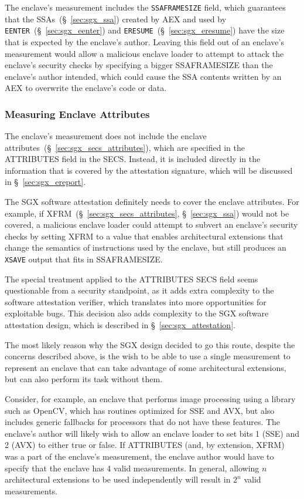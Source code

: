 The enclave's measurement includes the \texttt{SSAFRAMESIZE} field, which
guarantees that the SSAs~(\S~\ref{sec:sgx_ssa}) created by AEX and used by
\texttt{EENTER}~(\S~\ref{sec:sgx_eenter}) and
\texttt{ERESUME}~(\S~\ref{sec:sgx_eresume}) have the size that is expected by
the enclave's author. Leaving this field out of an enclave's measurement would
allow a malicious enclave loader to attempt to attack the enclave's security
checks by specifying a bigger SSAFRAMESIZE than the enclave's author intended,
which could cause the SSA contents written by an AEX to overwrite the enclave's
code or data.


\subsubsection{Measuring Enclave Attributes}
\label{sec:sgx_ecreate_mrenclave_no_attributes}

The enclave's measurement does not include the enclave
attributes~(\S~\ref{sec:sgx_secs_attributes}), which are specified in the
ATTRIBUTES field in the SECS. Instead, it is included directly in the
information that is covered by the attestation signature, which will be
discussed in \S~\ref{sec:sgx_ereport}.

The SGX software attestation definitely needs to cover the enclave attributes.
For example, if XFRM~(\S~\ref{sec:sgx_secs_attributes}, \S~\ref{sec:sgx_ssa})
would not be covered, a malicious enclave loader could attempt to subvert an
enclave's security checks by setting XFRM to a value that enables architectural
extensions that change the semantics of instructions used by the enclave, but
still produces an \texttt{XSAVE} output that fits in SSAFRAMESIZE.

The special treatment applied to the ATTRIBUTES SECS field seems questionable
from a security standpoint, as it adds extra complexity to the software
attestation verifier, which translates into more opportunities for exploitable
bugs. This decision also adds complexity to the SGX software attestation
design, which is described in \S~\ref{sec:sgx_attestation}.

The most likely reason why the SGX design decided to go this route, despite the
concerns described above, is the wish to be able to use a single measurement to
represent an enclave that can take advantage of some architectural extensions,
but can also perform its task without them.

Consider, for example, an enclave that performs image processing using a
library such as OpenCV, which has routines optimized for SSE and AVX, but also
includes generic fallbacks for processors that do not have these features. The
enclave's author will likely wish to allow an enclave loader to set bits 1
(SSE) and 2 (AVX) to either true or false. If ATTRIBUTES (and, by extension,
XFRM) was a part of the enclave's measurement, the enclave author would have to
specify that the enclave has 4 valid measurements. In general, allowing $n$
architectural extensions to be used independently will result in $2^n$ valid
measurements.


